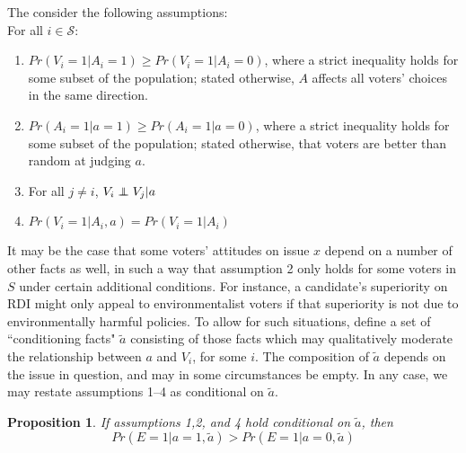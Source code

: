 \documentclass[11pt]{article}
\def\independenT#1#2{\mathrel{\rlap{$#1#2$}\mkern2mu{#1#2}}}
\newcommand\independent{\protect\mathpalette{\protect\independenT}{\perp}}
\newtheorem*{prop*}{Proposition}
\begin{document}
The consider the following assumptions:\\
For all $i\in\mathcal{S}$:
\begin{enumerate}
\item $Pr(V_i=1|A_i=1)\ge Pr(V_i=1|A_i=0)$, where a strict inequality holds for some subset of the population; stated otherwise, $A$ affects all voters' choices in the same direction.
\item $Pr(A_i=1|a=1)\ge Pr(A_i=1|a=0)$, where a strict inequality holds for some subset of the population; stated otherwise, that voters are better than random at judging $a$.
\item For all $j\ne i$, $V_i \independent V_j|a$
\item $Pr(V_i=1|A_i, a)=Pr(V_i=1|A_i)$
\end{enumerate}

It may be the case that some voters' attitudes on issue $x$ depend on a number of other facts as well,  in such a way that assumption 2 only holds for some voters in $S$ under certain additional conditions.
For instance, a candidate's superiority on RDI might only appeal to environmentalist voters if that superiority is not due to environmentally harmful policies. 
To allow for such situations, define a set of ``conditioning facts" $\tilde{a}$ consisting of those facts which may qualitatively moderate the relationship between $a$ and $V_i$, for some $i$.
The composition of $\tilde{a}$ depends on the issue in question, and may in some circumstances be empty.
In any case, we may restate assumptions 1--4 as conditional on $\tilde{a}$.

\begin{prop*}
If assumptions 1,2, and 4 hold conditional on $\tilde{a}$, then
\begin{equation}
Pr(E=1|a=1,\tilde{a})>Pr(E=1|a=0,\tilde{a})
\end{equation}
\end{prop*}
\end{document}
